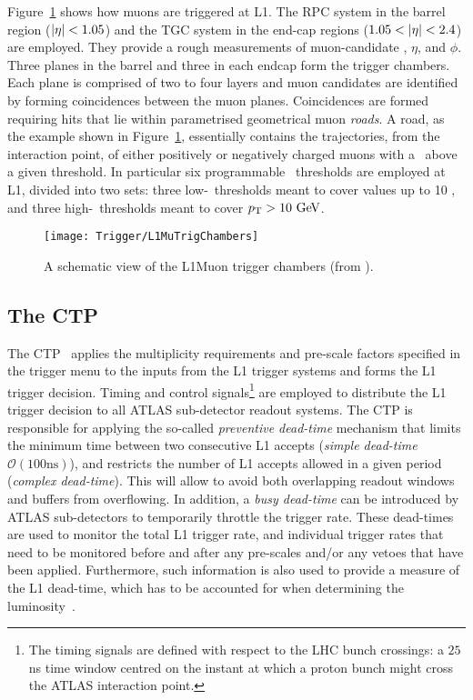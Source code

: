 			Figure~\ref{fig:L1MuTrig} shows how muons are triggered at \ac{L1}. The \ac{RPC} system in the barrel region ($|\eta| < 1.05$) and the \ac{TGC} system in the end-cap regions ($1.05 < |\eta| < 2.4$) are employed. They provide a rough measurements of muon-candidate \pt, $\eta$, and $\phi$. Three planes in the barrel and three in each endcap form the trigger chambers. Each plane is comprised of two to four layers and muon candidates are identified by forming coincidences between the muon planes. Coincidences are formed requiring hits that lie within parametrised geometrical muon \emph{roads}. A road, as the example shown in Figure~\ref{fig:L1MuTrig}, essentially contains the trajectories, from the interaction point, of either positively or negatively charged muons with a \pt\ above a given threshold. In particular six programmable \pt\ thresholds are employed at \ac{L1}, divided into two sets: three low-\pt\ thresholds meant to cover values up to 10 \GeV, and three high-\pt\ thresholds meant to cover $\pt > 10 \GeV$.

			\begin{figure}[!htb]
				\centering
				\texttt{[image: Trigger/L1MuTrigChambers]}
				\caption{\label{fig:L1MuTrig} A schematic view of the \ac{L1Muon} trigger chambers (from \cite{ATLASTrigger2010}).}
			\end{figure}


		\subsection*{The CTP}

			The \ac{CTP}~\cite{ATLASJINST} applies the multiplicity requirements and pre-scale factors specified in the trigger menu to the inputs from the \ac{L1} trigger systems and forms the \ac{L1} trigger decision. Timing and control signals\footnote{The timing signals are defined with respect to the \ac{LHC} bunch crossings: a $25$ ns time window centred on the instant at which a proton bunch might cross the \ac{ATLAS} interaction point.} are employed to distribute the \ac{L1} trigger decision to all \ac{ATLAS} sub-detector readout systems. The \ac{CTP} is responsible for applying the so-called \emph{preventive dead-time} mechanism that limits the minimum time between two consecutive \ac{L1} accepts (\emph{simple dead-time} $\mathcal{O}(100 \mathrm{ns})$), and restricts the number of L1 accepts allowed in a given period (\emph{complex dead-time}). This will allow to avoid both overlapping readout windows and buffers from overflowing. In addition, a \emph{busy dead-time} can be introduced by \ac{ATLAS} sub-detectors to temporarily throttle the trigger rate. These dead-times are used to monitor the total \ac{L1} trigger rate, and individual trigger rates that need to be monitored before and after any pre-scales and/or any vetoes that have been applied. Furthermore, such information is also used to provide a measure of the \ac{L1} dead-time, which has to be accounted for when determining the luminosity~\cite{ATLASTrigger2010}.

